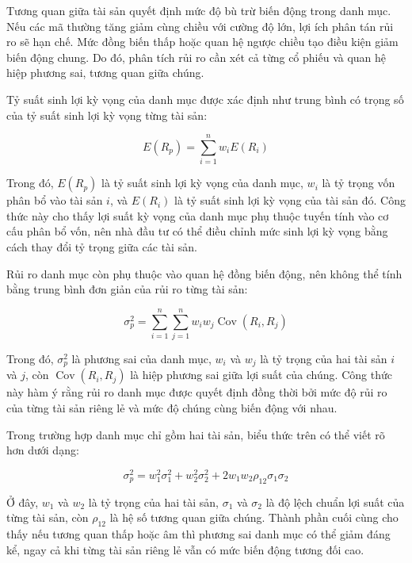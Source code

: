\documentclass[12pt,a4paper,openany,oneside]{book}
\begin{document}
Tương quan giữa tài sản quyết định mức độ bù trừ biến động trong danh mục. Nếu các mã thường tăng giảm cùng chiều với cường độ lớn, lợi ích phân tán rủi ro sẽ hạn chế. Mức đồng biến thấp hoặc quan hệ ngược chiều tạo điều kiện giảm biến động chung. Do đó, phân tích rủi ro cần xét cả từng cổ phiếu và quan hệ hiệp phương sai, tương quan giữa chúng.

Tỷ suất sinh lợi kỳ vọng của danh mục được xác định như trung bình có trọng số của tỷ suất sinh lợi kỳ vọng từng tài sản:

\begin{equation}\label{eq:theory-06}
E\left({R}_{p}\right)=\sum_{i=1}^{n}{{w}_{i}E\left({R}_{i}\right)}
\end{equation}

Trong đó, \(E\left({R}_{p}\right)\) là tỷ suất sinh lợi kỳ vọng của danh mục, \({w}_{i}\) là tỷ trọng vốn phân bổ vào tài sản \(i\), và \(E\left({R}_{i}\right)\) là tỷ suất sinh lợi kỳ vọng của tài sản đó. Công thức này cho thấy lợi suất kỳ vọng của danh mục phụ thuộc tuyến tính vào cơ cấu phân bổ vốn, nên nhà đầu tư có thể điều chỉnh mức sinh lợi kỳ vọng bằng cách thay đổi tỷ trọng giữa các tài sản.

Rủi ro danh mục còn phụ thuộc vào quan hệ đồng biến động, nên không thể tính bằng trung bình đơn giản của rủi ro từng tài sản:

\begin{equation}\label{eq:theory-07}
{\sigma}_{p}^{2}=\sum_{i=1}^{n}{\sum_{j=1}^{n}{{w}_{i}{w}_{j}}\operatorname{Cov}\left({R}_{i},{R}_{j}\right)}
\end{equation}

Trong đó, \({\sigma}_{p}^{2}\) là phương sai của danh mục, \({w}_{i}\) và \({w}_{j}\) là tỷ trọng của hai tài sản \(i\) và \(j\), còn \(\operatorname{Cov}\left({R}_{i},{R}_{j}\right)\) là hiệp phương sai giữa lợi suất của chúng. Công thức này hàm ý rằng rủi ro danh mục được quyết định đồng thời bởi mức độ rủi ro của từng tài sản riêng lẻ và mức độ chúng cùng biến động với nhau.

Trong trường hợp danh mục chỉ gồm hai tài sản, biểu thức trên có thể viết rõ hơn dưới dạng:

\begin{equation}\label{eq:theory-08}
{\sigma}_{p}^{2}={w}_{1}^{2}{\sigma}_{1}^{2}+{w}_{2}^{2}{\sigma}_{2}^{2}+2{w}_{1}{w}_{2}{\rho}_{12}{\sigma}_{1}{\sigma}_{2}
\end{equation}

Ở đây, \({w}_{1}\) và \({w}_{2}\) là tỷ trọng của hai tài sản, \({\sigma}_{1}\) và \({\sigma}_{2}\) là độ lệch chuẩn lợi suất của từng tài sản, còn \({\rho}_{12}\) là hệ số tương quan giữa chúng. Thành phần cuối cùng cho thấy nếu tương quan thấp hoặc âm thì phương sai danh mục có thể giảm đáng kể, ngay cả khi từng tài sản riêng lẻ vẫn có mức biến động tương đối cao.
\end{document}
